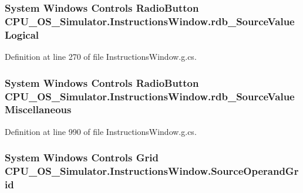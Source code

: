 \subsubsection[{rdb\+\_\+\+Source\+Value\+Logical}]{\setlength{\rightskip}{0pt plus 5cm}System Windows Controls Radio\+Button C\+P\+U\+\_\+\+O\+S\+\_\+\+Simulator.\+Instructions\+Window.\+rdb\+\_\+\+Source\+Value\+Logical\hspace{0.3cm}{\ttfamily [package]}}\label{class_c_p_u___o_s___simulator_1_1_instructions_window_ad0e882b0d6d067460309ae6f1dda5d56}


Definition at line 270 of file Instructions\+Window.\+g.\+cs.

\hypertarget{class_c_p_u___o_s___simulator_1_1_instructions_window_ae6e33f7879251b63282f5d3eaa693507}{}
\subsubsection[{rdb\+\_\+\+Source\+Value\+Miscellaneous}]{\setlength{\rightskip}{0pt plus 5cm}System Windows Controls Radio\+Button C\+P\+U\+\_\+\+O\+S\+\_\+\+Simulator.\+Instructions\+Window.\+rdb\+\_\+\+Source\+Value\+Miscellaneous\hspace{0.3cm}{\ttfamily [package]}}\label{class_c_p_u___o_s___simulator_1_1_instructions_window_ae6e33f7879251b63282f5d3eaa693507}


Definition at line 990 of file Instructions\+Window.\+g.\+cs.

\hypertarget{class_c_p_u___o_s___simulator_1_1_instructions_window_a6e37ff7da499bab3f5b0037d2b4c68cd}{}
\subsubsection[{Source\+Operand\+Grid}]{\setlength{\rightskip}{0pt plus 5cm}System Windows Controls Grid C\+P\+U\+\_\+\+O\+S\+\_\+\+Simulator.\+Instructions\+Window.\+Source\+Operand\+Grid\hspace{0.3cm}{\ttfamily [package]}}\label{class_c_p_u___o_s___simulator_1_1_instructions_window_a6e37ff7da499bab3f5b0037d2b4c68cd}


